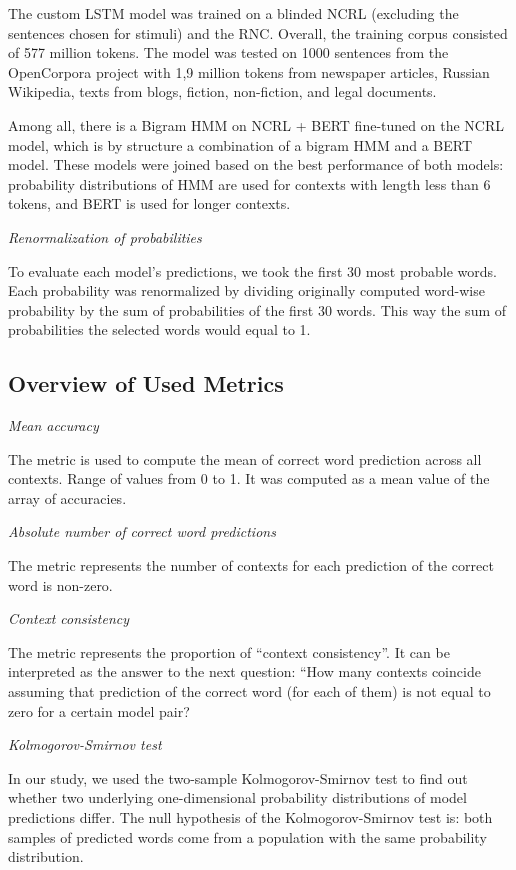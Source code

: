 \documentclass[a4paper]{article}
\newcommand{\head}[1]{\vspace{0.5em}\emph{#1}\vspace{0.25em}}
\begin{document}
The custom LSTM model was trained on a blinded NCRL (excluding the sentences chosen for stimuli) and the RNC. Overall, the training corpus consisted of 577 million tokens. The model was tested on 1000 sentences from the OpenCorpora project \cite{bocharov:2011} with 1,9 million tokens from newspaper articles, Russian Wikipedia, texts from blogs, fiction, non-fiction, and legal documents. 

Among all, there is a Bigram HMM on NCRL + BERT fine-tuned on the NCRL model, which is by structure a combination of a bigram HMM and a BERT model. These models were joined based on the best performance of both models: probability distributions of HMM are used for contexts with length less than 6 tokens, and BERT is used for longer contexts. 

\head{Renormalization of probabilities}

To evaluate each model’s predictions, we took the first 30 most probable words. Each probability was renormalized by dividing originally computed word-wise probability by the sum of probabilities of the first 30 words. This way the sum of probabilities the selected words would equal to 1.

\subsection{Overview of Used Metrics}

\head{Mean accuracy}

The metric is used to compute the mean of correct word prediction across all contexts.  Range of values from 0 to 1. It was computed as a mean value of the array of accuracies.

\head{Absolute number of correct word predictions}

The metric represents the number of contexts for each prediction of the correct word is non-zero. 

\head{Context consistency}

The metric represents the proportion of “context consistency”. It can be interpreted as the answer to the next question: “How many contexts coincide assuming that prediction of the correct word (for each of them) is not equal to zero for a certain model pair?

\head{Kolmogorov-Smirnov test}

In our study, we used the two-sample Kolmogorov-Smirnov test to find out whether two underlying one-dimensional probability distributions of model predictions differ. The null hypothesis of the Kolmogorov-Smirnov test is: both samples of predicted words come from a population with the same probability distribution. 
\end{document}
